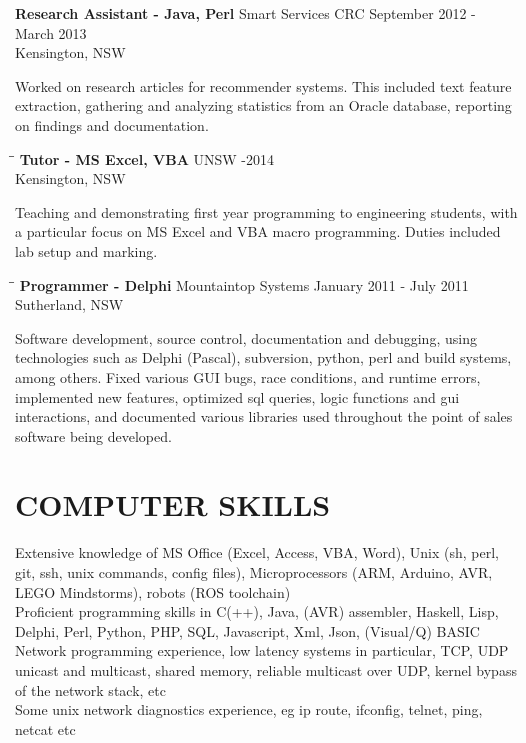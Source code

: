 \documentclass{res}
\begin{document}
\begin{resume}
\begin{tabbing}
    {\bf Research Assistant - Java, Perl} \>Smart Services CRC \>September 2012 - March 2013\\
                             \>Kensington, NSW
   \end{tabbing}\vspace{-20pt}      %
    Worked on research articles for recommender systems. This included text
    feature extraction, gathering and analyzing statistics from an Oracle
    database, reporting on findings and documentation.
   \begin{tabbing}
   \hspace{2.3in}\= \hspace{2.6in}\= \kill %
    {\bf Tutor - MS Excel, VBA} \>UNSW     -2014\\
                           \>Kensington, NSW
   \end{tabbing}\vspace{-20pt}      %
    Teaching and demonstrating first year programming to engineering students,
    with a particular focus on MS Excel and VBA macro programming. Duties
    included lab setup and marking.
   \begin{tabbing}
   \hspace{2.3in}\= \hspace{2.6in}\= \kill %
    {\bf Programmer - Delphi} \>Mountaintop Systems \> January 2011 - July 2011\\
                          \>Sutherland, NSW
   \end{tabbing}\vspace{-20pt}
    Software development, source control, documentation and debugging,
    using technologies such as Delphi (Pascal), subversion, python, perl and
    build systems, among others. Fixed various GUI bugs, race conditions, and
    runtime errors, implemented new features, optimized sql queries, logic
    functions and gui interactions, and documented various libraries used
    throughout the point of sales software being developed.


\section{COMPUTER SKILLS}          
    Extensive knowledge of MS Office (Excel, Access, VBA, Word), Unix (sh, perl, git, ssh, unix commands, config files), Microprocessors (ARM, Arduino, AVR, LEGO Mindstorms), robots (ROS toolchain) \\
    Proficient programming skills in C(++), Java, (AVR) assembler, Haskell, Lisp, Delphi, Perl, Python, PHP, SQL, Javascript, Xml, Json, (Visual/Q) BASIC \\
    Network programming experience, low latency systems in particular, TCP, UDP unicast and multicast, shared memory, reliable multicast over UDP, kernel bypass of the network stack, etc \\
    Some unix network diagnostics experience, eg ip route, ifconfig, telnet, ping, netcat etc
 

\end{resume}
\end{document}
